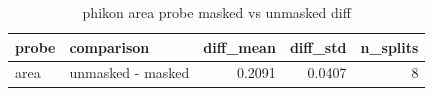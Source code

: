 \begin{table}
\caption{phikon area probe masked vs unmasked diff}
\label{tab:phikon_area_probe_masked_vs_unmasked_diff}
\begin{tabular}{llrrr}
\toprule
probe & comparison & diff_mean & diff_std & n_splits \\
\midrule
area & unmasked - masked & 0.2091 & 0.0407 & 8 \\
\bottomrule
\end{tabular}
\end{table}
